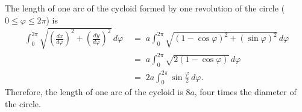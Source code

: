 \documentclass[12pt]{article}
\begin{document}
The length of one arc of the cycloid formed by one revolution of the circle (\, $0 \le \varphi \le 2\pi$) is
\begin{align*}
\int_0^{2\pi}\!\sqrt{\left(\frac{dx}{d\varphi}\right)^2\!+\!\left(\frac{dy}{d\varphi}\right)^2}\,d\varphi &\;=\; a\!\int_0^{2\pi}\!\sqrt{(1\!-\!\cos\varphi)^2\!+\!(\sin\varphi)^2}\,d\varphi \\
& \;=\; a\!\int_0^{2\pi}\!\sqrt{2(1\!-\!\cos\varphi)}\,d\varphi \\
& \;=\; 2a\!\int_0^{2\pi}\!\sin\frac{\varphi}{2}\,d\varphi.
\end{align*}
Therefore, the length of one arc of the cycloid is $8a$,  four times the diameter of the circle.
\end{document}
